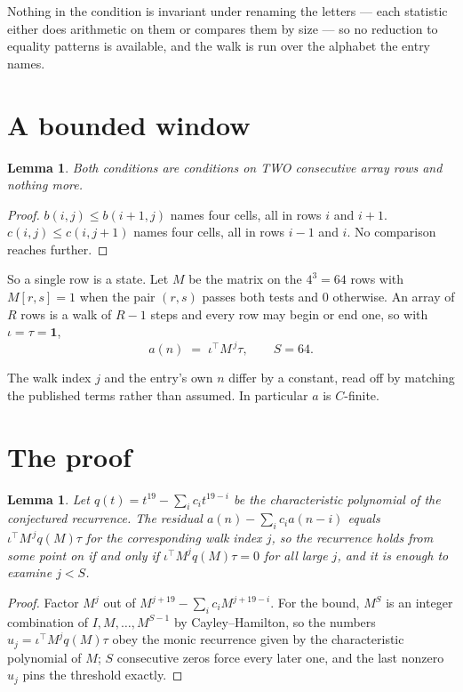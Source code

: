 \documentclass[11pt,a4paper]{article}
\theoremstyle{plain}
\newtheorem{lemma}[theorem]{Lemma}
\theoremstyle{definition}
\begin{document}
Nothing in the condition is invariant under renaming the letters --- each statistic either does
arithmetic on them or compares them by size --- so no reduction to equality patterns is
available, and the walk is run over the alphabet the entry names.

\section{A bounded window}

\begin{lemma}\label{lem:win}
Both conditions are conditions on TWO consecutive array rows and nothing more.
\end{lemma}

\begin{proof}
$b(i,j)\le b(i{+}1,j)$ names four cells, all in rows $i$ and $i+1$. $c(i,j)\le c(i,j{+}1)$
names four cells, all in rows $i-1$ and $i$. No comparison reaches further.
\end{proof}

So a single row is a state. Let $M$ be the matrix on the $4^{3}=64$ rows with
$M[r,s]=1$ when the pair $(r,s)$ passes both tests and $0$ otherwise. An array of $R$ rows is a
walk of $R-1$ steps and every row may begin or end one, so with $\iota=\tau=\mathbf{1}$,
\[
a(n)\;=\;\iota^{\!\top}M^{\,j}\tau ,\qquad S=64.
\]

The walk index $j$ and the entry's own $n$ differ by a constant, read off by matching the
published terms rather than assumed. In particular $a$ is $C$-finite.

\section{The proof}

\begin{lemma}\label{lem:crit}
Let $q(t)=t^{19}-\sum_i c_it^{19-i}$ be the characteristic polynomial of the
conjectured recurrence. The residual $a(n)-\sum_ic_ia(n-i)$ equals
$\iota^{\!\top}M^{\,j}q(M)\tau$ for the corresponding walk index $j$, so the recurrence
holds from some point on if and only if $\iota^{\!\top}M^{j}q(M)\tau=0$ for all large $j$,
and it is enough to examine $j<S$.
\end{lemma}

\begin{proof}
Factor $M^{j}$ out of $M^{j+19}-\sum_ic_iM^{j+19-i}$. For the bound, $M^{S}$
is an integer combination of $I,M,\dots,M^{S-1}$ by Cayley--Hamilton, so the numbers
$u_j=\iota^{\!\top}M^{j}q(M)\tau$ obey the monic recurrence given by the characteristic
polynomial of $M$; $S$ consecutive zeros force every later one, and the last nonzero $u_j$
pins the threshold exactly.
\end{proof}
\end{document}
